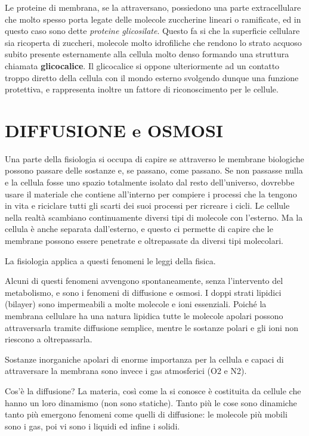 \documentclass[]{article}
\begin{document}
Le proteine di membrana, se la attraversano, possiedono una parte
extracellulare che molto spesso porta legate delle molecole zuccherine
lineari o ramificate, ed in questo caso sono dette \emph{proteine
glicosilate}. Questo fa si che la superficie cellulare sia ricoperta di
zuccheri, molecole molto idrofiliche che rendono lo strato acquoso
subito presente esternamente alla cellula molto denso formando una
struttura chiamata \textbf{glicocalice}. Il glicocalice si oppone
ulteriormente ad un contatto troppo diretto della cellula con il mondo
esterno svolgendo dunque una funzione protettiva, e rappresenta inoltre
un fattore di riconoscimento per le cellule.

\section{DIFFUSIONE e OSMOSI}\label{diffusione-e-osmosi}

Una parte della fisiologia si occupa di capire se attraverso le membrane
biologiche possono passare delle sostanze e, se passano, come passano.
Se non passasse nulla e la cellula fosse uno spazio totalmente isolato
dal resto dell'universo, dovrebbe usare il materiale che contiene
all'interno per compiere i processi che la tengono in vita e riciclare
tutti gli scarti dei suoi processi per ricreare i cicli. Le cellule
nella realtà scambiano continuamente diversi tipi di molecole con
l'esterno. Ma la cellula è anche separata dall'esterno, e questo ci
permette di capire che le membrane possono essere penetrate e
oltrepassate da diversi tipi molecolari.

La fisiologia applica a questi fenomeni le leggi della fisica.

Alcuni di questi fenomeni avvengono spontaneamente, senza l'intervento
del metabolismo, e sono i fenomeni di diffusione e osmosi. I doppi
strati lipidici (bilayer) sono impermeabili a molte molecole e ioni
essenziali. Poiché la membrana cellulare ha una natura lipidica tutte le
molecole apolari possono attraversarla tramite diffusione semplice,
mentre le sostanze polari e gli ioni non riescono a oltrepassarla.

Sostanze inorganiche apolari di enorme importanza per la cellula e
capaci di attraversare la membrana sono invece i gas atmosferici (O2 e
N2).

Cos'è la diffusione? La materia, così come la si conosce è costituita da
cellule che hanno un loro dinamismo (non sono statiche). Tanto più le
cose sono dinamiche tanto più emergono fenomeni come quelli di
diffusione: le molecole più mobili sono i gas, poi vi sono i liquidi ed
infine i solidi.
\end{document}
